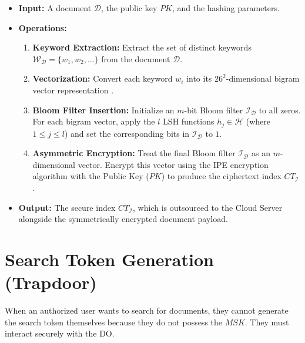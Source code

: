 \begin{itemize}
    \item \textbf{Input:} A document $\mathcal{D}$, the public key $PK$, and the hashing parameters.
    \item \textbf{Operations:}
    \begin{enumerate}
        \item \textbf{Keyword Extraction:} Extract the set of distinct keywords $\mathcal{W_D} = \{w_1, w_2, \dots \}$ from the document $\mathcal{D}$.%
        \item \textbf{Vectorization:} Convert each keyword $w_i$ into its $26^2$-dimensional bigram vector representation \cite{wang2014privacy}.%
        \item \textbf{Bloom Filter Insertion:} Initialize an $m$-bit Bloom filter $\mathcal{I_D}$ to all zeros. For each bigram vector, apply the $l$ LSH functions $h_j \in \mathcal{H}$ (where $1 \le j \le l$) and set the corresponding bits in $\mathcal{I_D}$ to $1$.%
        \item \textbf{Asymmetric Encryption:} Treat the final Bloom filter $\mathcal{I_D}$ as an $m$-dimensional vector. Encrypt this vector using the IPE encryption algorithm with the Public Key ($PK$) to produce the ciphertext index $CT_{\mathcal{I}}$ \cite{shen2009predicate}.
    \end{enumerate}
    \item \textbf{Output:} The secure index $CT_{\mathcal{I}}$, which is outsourced to the Cloud Server alongside the symmetrically encrypted document payload.
\end{itemize}

\section{Search Token Generation (Trapdoor)}
When an authorized user wants to search for documents, they cannot generate the search token themselves because they do not possess the $MSK$. They must interact securely with the DO.


